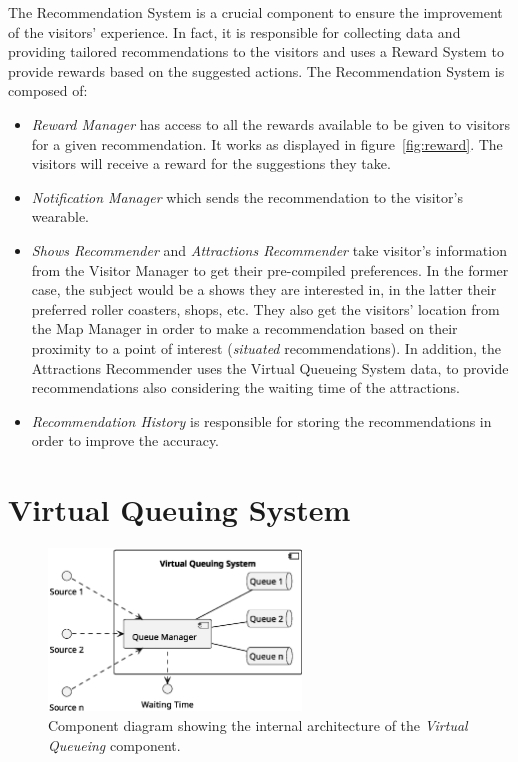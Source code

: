 The Recommendation System is a crucial component to ensure the improvement of the visitors' experience. In fact, it is responsible for collecting
data and providing tailored recommendations to the visitors and uses a Reward System to provide rewards based on the suggested actions. The Recommendation System is composed of:
\begin{itemize}
	\item \textit{Reward Manager} has access to all the rewards available to be given to visitors for a given recommendation. It works as displayed in figure~\ref{fig:reward}.
	      The visitors will receive a reward for the suggestions they take.
	\item \textit{Notification Manager} which sends the recommendation to the visitor's wearable.
	\item \textit{Shows Recommender} and \textit{Attractions Recommender} take visitor's information from the Visitor Manager to get their pre-compiled preferences.
	      In the former case, the subject would be a shows they are interested in, in the latter their preferred roller coasters, shops, etc. They also get the visitors' location from the Map Manager in order to make a recommendation based on their proximity to a point of interest (\textit{situated} recommendations).
	      In addition, the Attractions Recommender uses the Virtual Queueing System data, to provide recommendations also considering the waiting time of the attractions.
	\item \textit{Recommendation History} is responsible for storing the recommendations in order to improve the accuracy.
\end{itemize}

\section{Virtual Queuing System}
\begin{figure}[H]
	\centering
	\includegraphics[width=0.6\textwidth]{img/virtual-queuing.eps}
	\caption{Component diagram showing the internal architecture of the \textit{Virtual Queueing} component.
	}
	\label{fig:virtual-queueing-arch}
\end{figure}

